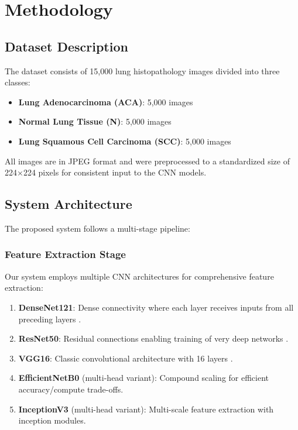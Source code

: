 \documentclass[journal]{IEEEtran}
\begin{document}
\section{Methodology}

\subsection{Dataset Description}

The dataset consists of 15,000 lung histopathology images divided into three classes:
\begin{itemize}
    \item \textbf{Lung Adenocarcinoma (ACA)}: 5,000 images
    \item \textbf{Normal Lung Tissue (N)}: 5,000 images  
    \item \textbf{Lung Squamous Cell Carcinoma (SCC)}: 5,000 images
\end{itemize}

All images are in JPEG format and were preprocessed to a standardized size of 224×224 pixels for consistent input to the CNN models.

\subsection{System Architecture}

The proposed system follows a multi-stage pipeline:

\subsubsection{Feature Extraction Stage}

Our system employs multiple CNN architectures for comprehensive feature extraction:

\begin{enumerate}
    \item \textbf{DenseNet121}: Dense connectivity where each layer receives inputs from all preceding layers \cite{huang2017densenet}.
    \item \textbf{ResNet50}: Residual connections enabling training of very deep networks \cite{he2016resnet}.
    \item \textbf{VGG16}: Classic convolutional architecture with 16 layers \cite{simonyan2014vgg}.
    \item \textbf{EfficientNetB0} (multi-head variant): Compound scaling for efficient accuracy/compute trade-offs.
    \item \textbf{InceptionV3} (multi-head variant): Multi-scale feature extraction with inception modules.
\end{enumerate}
\end{document}
